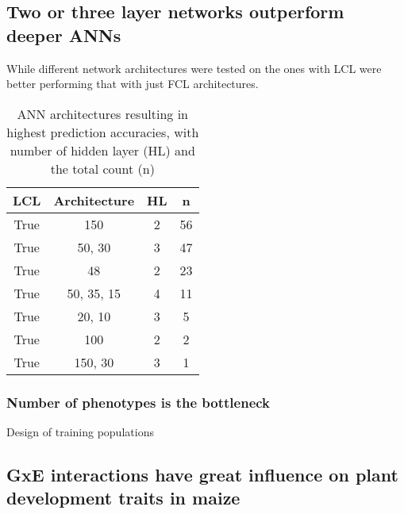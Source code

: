 \subsection{Two or three layer networks outperform deeper ANNs}

While different network architectures were tested on the ones with LCL were better
performing that with just FCL architectures.



\onehalfspacing
\begin{table}[H]
 \centering
 \caption[ANN architectures of ANN resulting in highest prediction
 accuracies]{ANN architectures resulting in highest prediction
  accuracies, with number of hidden layer (HL) and the total count
  (n)}
 \begin{tabular}{cccc}
  \toprule
  LCL & Architecture & HL & n \\ 
  \midrule
  True & 150     & 2 & 56 \\ 
  True & 50, 30    & 3 & 47 \\ 
  True & 48      & 2 & 23 \\ 
  True & 50, 35, 15  & 4 & 11 \\ 
  True & 20, 10    & 3 & 5 \\ 
  True & 100     & 2 & 2 \\ 
  True & 150, 30   & 3 & 1 \\
  \bottomrule
\end{tabular}
\end{table}
\doublespacing

\subsubsection{Number of phenotypes is the bottleneck}

Design of training populations \cite{akdemir2019design}



\subsection{GxE interactions have great influence on plant development traits in maize}

